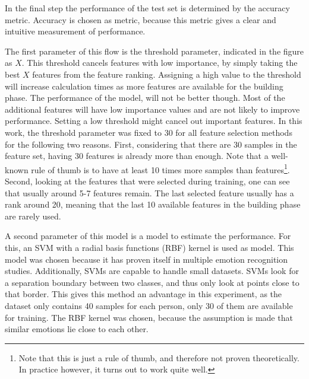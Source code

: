 \npar

In the final step the performance of the test set is determined by the accuracy metric. Accuracy is chosen as metric, because this metric gives a clear and intuitive measurement of performance.

\npar

The first parameter of this flow is the threshold parameter, indicated in the figure as $X$. This threshold cancels features with low importance, by simply taking the best $X$ features from the feature ranking. Assigning a high value to the threshold will increase calculation times as more features are available for the building phase. The performance of the model, will not be better though. Most of the additional features will have low importance values and are not likely to improve performance. Setting a low threshold might cancel out important features. 
In this work, the threshold parameter was fixed to 30 for all feature selection methods for the following two reasons. First, considering that there are 30 samples in the feature set, having 30 features is already more than enough. Note that a well-known rule of thumb is to have at least 10 times more samples than features\citep{rot1,rot2}\footnote{Note that this is just a rule of thumb, and therefore not proven theoretically. In practice however, it turns out to work quite well.}. Second, looking at the features that were selected during training, one can see that usually around 5-7 features remain. The last selected feature usually has a rank around 20, meaning that the last 10 available features in the building phase are rarely used.

\npar
A second parameter of this model is a model to estimate the performance. For this, an SVM with a radial basis functions (RBF) kernel is used as model. This model was chosen because it has proven itself in multiple emotion recognition studies\citep{killyPaper,emorecoghard}. Additionally, SVMs are capable to handle small datasets. SVMs look for a separation boundary between two classes, and thus only look at points close to that border. This gives this method an advantage in this experiment, as the dataset only contains 40 samples for each person, only 30 of them are available for training. The RBF kernel was chosen, because the assumption is made that similar emotions lie close to each other. 

\npar

